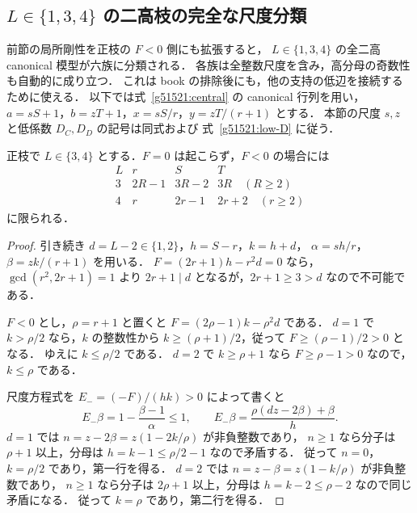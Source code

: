 \subsection{\texorpdfstring{$L\in\{1,3,4\}$}{L=1,3,4} の二高枝の完全な尺度分類}
\label{rs22:section}

前節の局所剛性を正枝の $F<0$ 側にも拡張すると，
$L\in\{1,3,4\}$ の全二高 canonical 模型が六族に分類される．
各族は全整数尺度を含み，高分母の奇数性も自動的に成り立つ．
これは book の排除後にも，他の支持の低辺を接続するために使える．
以下では式~\eqref{g51521:central} の canonical 行列を用い，
$a=sS+1$，$b=zT+1$，$x=sS/r$，$y=zT/(r+1)$ とする．
本節の尺度 $s,z$ と低係数 $D_C,D_D$ の記号は同式および
式~\eqref{g51521:low-D} に従う．

\begin{lemma}
\label{rs22:negative-F-rigidity}
正枝で $L\in\{3,4\}$ とする．$F=0$ は起こらず，$F<0$ の場合には
\[
 \begin{array}{c|ccc}
 L&r&S&T\\\hline
 3&2R-1&3R-2&3R\quad(R\ge2)\\
 4&r&2r-1&2r+2\quad(r\ge2)
 \end{array}
\]
に限られる．
\end{lemma}

\begin{proof}
引き続き $d=L-2\in\{1,2\}$，$h=S-r$，$k=h+d$，
$\alpha=sh/r$，$\beta=zk/(r+1)$ を用いる．
$F=(2r+1)h-r^2d=0$ なら，$\gcd(r^2,2r+1)=1$ より
$2r+1\mid d$ となるが，$2r+1\ge3>d$ なので不可能である．

$F<0$ とし，$\rho=r+1$ と置くと
$F=(2\rho-1)k-\rho^2d$ である．
$d=1$ で $k>\rho/2$ なら，$k$ の整数性から
$k\ge(\rho+1)/2$，従って $F\ge(\rho-1)/2>0$ となる．
ゆえに $k\le\rho/2$ である．
$d=2$ で $k\ge\rho+1$ なら $F\ge\rho-1>0$ なので，$k\le\rho$ である．

尺度方程式を $E_-=(-F)/(hk)>0$ によって書くと
\[
 E_-\beta=1-\frac{\beta-1}{\alpha}\le1,
 \qquad
 E_-\beta=\frac{\rho(dz-2\beta)+\beta}{h}.
\]
$d=1$ では $n=z-2\beta=z(1-2k/\rho)$ が非負整数であり，
$n\ge1$ なら分子は $\rho+1$ 以上，分母は
$h=k-1\le\rho/2-1$ なので矛盾する．
従って $n=0$，$k=\rho/2$ であり，第一行を得る．
$d=2$ では $n=z-\beta=z(1-k/\rho)$ が非負整数であり，
$n\ge1$ なら分子は $2\rho+1$ 以上，分母は
$h=k-2\le\rho-2$ なので同じ矛盾になる．
従って $k=\rho$ であり，第二行を得る．
\end{proof}

